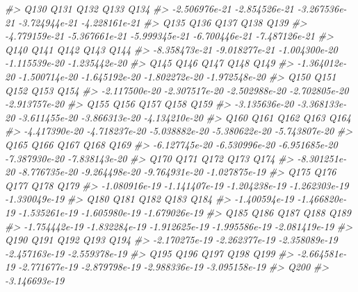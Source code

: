 \documentclass[]{article}
\newenvironment{Shaded}{\begin{snugshade}}{\end{snugshade}}
\newcommand{\CommentTok}[1]{\textcolor[rgb]{0.56,0.35,0.01}{\textit{#1}}}
\begin{document}
\begin{Shaded}
\begin{Highlighting}[]
\CommentTok{#>          Q130          Q131          Q132          Q133          Q134 }
\CommentTok{#> -2.506976e-21 -2.854526e-21 -3.267536e-21 -3.724944e-21 -4.228161e-21 }
\CommentTok{#>          Q135          Q136          Q137          Q138          Q139 }
\CommentTok{#> -4.779159e-21 -5.367661e-21 -5.999345e-21 -6.700446e-21 -7.487126e-21 }
\CommentTok{#>          Q140          Q141          Q142          Q143          Q144 }
\CommentTok{#> -8.358473e-21 -9.018277e-21 -1.004300e-20 -1.115539e-20 -1.235442e-20 }
\CommentTok{#>          Q145          Q146          Q147          Q148          Q149 }
\CommentTok{#> -1.364012e-20 -1.500714e-20 -1.645192e-20 -1.802272e-20 -1.972548e-20 }
\CommentTok{#>          Q150          Q151          Q152          Q153          Q154 }
\CommentTok{#> -2.117500e-20 -2.307517e-20 -2.502988e-20 -2.702805e-20 -2.913757e-20 }
\CommentTok{#>          Q155          Q156          Q157          Q158          Q159 }
\CommentTok{#> -3.135636e-20 -3.368133e-20 -3.611455e-20 -3.866313e-20 -4.134210e-20 }
\CommentTok{#>          Q160          Q161          Q162          Q163          Q164 }
\CommentTok{#> -4.417390e-20 -4.718237e-20 -5.038882e-20 -5.380622e-20 -5.743807e-20 }
\CommentTok{#>          Q165          Q166          Q167          Q168          Q169 }
\CommentTok{#> -6.127745e-20 -6.530996e-20 -6.951685e-20 -7.387930e-20 -7.838143e-20 }
\CommentTok{#>          Q170          Q171          Q172          Q173          Q174 }
\CommentTok{#> -8.301251e-20 -8.776735e-20 -9.264498e-20 -9.764931e-20 -1.027875e-19 }
\CommentTok{#>          Q175          Q176          Q177          Q178          Q179 }
\CommentTok{#> -1.080916e-19 -1.141407e-19 -1.204238e-19 -1.262303e-19 -1.330049e-19 }
\CommentTok{#>          Q180          Q181          Q182          Q183          Q184 }
\CommentTok{#> -1.400594e-19 -1.466820e-19 -1.535261e-19 -1.605980e-19 -1.679026e-19 }
\CommentTok{#>          Q185          Q186          Q187          Q188          Q189 }
\CommentTok{#> -1.754442e-19 -1.832284e-19 -1.912625e-19 -1.995586e-19 -2.081419e-19 }
\CommentTok{#>          Q190          Q191          Q192          Q193          Q194 }
\CommentTok{#> -2.170275e-19 -2.262377e-19 -2.358089e-19 -2.457163e-19 -2.559378e-19 }
\CommentTok{#>          Q195          Q196          Q197          Q198          Q199 }
\CommentTok{#> -2.664581e-19 -2.771677e-19 -2.879798e-19 -2.988336e-19 -3.095158e-19 }
\CommentTok{#>          Q200 }
\CommentTok{#> -3.146693e-19}
\end{Highlighting}
\end{Shaded}
\end{document}
